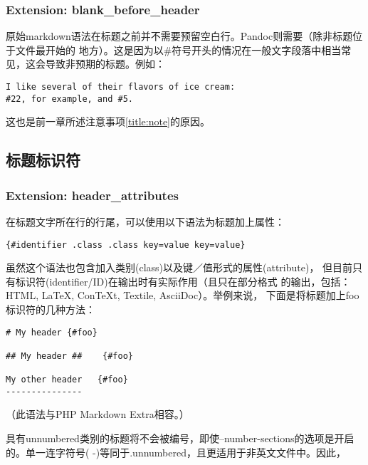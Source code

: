 \documentclass[fancyhdr,bookmark]{ctexbook}
\begin{document}
\hypertarget{extension-blank_before_header}{%
\subsubsection{Extension:
blank\_before\_header}\label{extension-blank_before_header}}

原始markdown语法在标题之前并不需要预留空白行。Pandoc则需要（除非标题位于文件最开始的
地方）。这是因为以\#符号开头的情况在一般文字段落中相当常见，这会导致非预期的标题。例如：

\begin{lstlisting}
I like several of their flavors of ice cream:
#22, for example, and #5.
\end{lstlisting}

这也是前一章所述注意事项\ref{title:note}的原因。

\hypertarget{ux6807ux9898ux6807ux8bc6ux7b26}{%
\subsection{标题标识符}\label{ux6807ux9898ux6807ux8bc6ux7b26}}

\hypertarget{extension-header_attributes}{%
\subsubsection{Extension:
header\_attributes}\label{extension-header_attributes}}

在标题文字所在行的行尾，可以使用以下语法为标题加上属性：

\begin{lstlisting}
{#identifier .class .class key=value key=value}
\end{lstlisting}

虽然这个语法也包含加入类别(class)以及键／值形式的属性(attribute)，
但目前只有标识符(identifier/ID)在输出时有实际作用（且只在部分格式
的输出，包括：HTML, LaTeX, ConTeXt, Textile, AsciiDoc）。举例来说，
下面是将标题加上foo标识符的几种方法：

\begin{lstlisting}
# My header {#foo}

## My header ##    {#foo}

My other header   {#foo}
---------------
\end{lstlisting}

（此语法与PHP Markdown Extra相容。）

具有unnumbered类别的标题将不会被编号，即使--number-sections的选项是开启
的。单一连字符号( -)等同于.unnumbered，且更适用于非英文文件中。因此，
\end{document}
